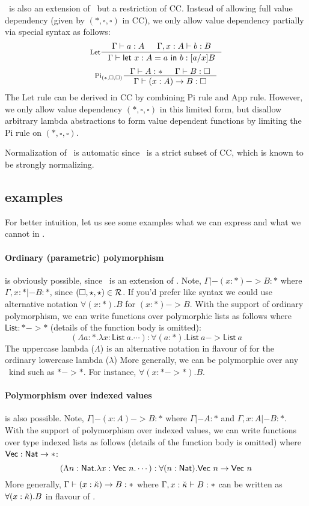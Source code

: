 \Fi\ is also an extension of \Fw\, but a restriction of CC.  Instead of
allowing full value dependency (given by $(*,\square,\square)$ in CC),
we only allow value dependency partially via special syntax as follows:
\[
 \inference[Let]{\Gamma |- a:A & \Gamma, x:A |- b:B}
                {\Gamma |- \mathsf{let}~x:A=a~\mathsf{in}~b : [a/x]B}
\]
\[
 \inference[Pi$_{(*,\square,\square)}$]
     {\Gamma |- A:* & \Gamma |- B:\square}
     {\Gamma |- (x:A)-> B : \square}
\]
The Let rule can be derived in CC by combining Pi rule and App rule.  However,
we only allow value dependency $(*,\square,\square)$ in this limited form,
but disallow arbitrary lambda abstractions to form value dependent functions
by limiting the Pi rule on $(*,\square,\square)$.

Normalization of \Fi\ is automatic since \Fi\ is a strict subset of CC,
which is known to be strongly normalizing.

\subsection{examples}
For better intuition, let us see some examples what we can express and
what we cannot in \Fi.
\newcommand{\List}{\mathsf{List}}
\newcommand{\Vect}{\mathsf{Vec}}

\paragraph{Ordinary (parametric) polymorphism} is obviously possible,
since \Fi\ is an extension of \Fw. Note, $\Gamma |- (x:*) -> B : *$
where $\Gamma,x:* |- B:*$, since $(\square,\star,\star) \in\mathcal{R}$.
If you'd prefer \Fw\-like syntax we could use alternative notation
$\forall(x:*).B$ for $(x:*) -> B$. With the support of ordinary polymorphism,
we can write functions over polymorphic lists as follows
where $\List : * -> *$ (details of the function body is omitted):
\[ (\Lambda a:*.\lambda x:\List~a. \cdots) : \forall(a:*).\List~a -> \List~a \]
The uppercase lambda ($\Lambda$) is an alternative notation in flavour of \Fw
for the ordinary lowercase lambda ($\lambda$)
More generally, we can be polymorphic over any \Fw\ kind such as $* -> *$.
For instance, $\forall(x:* -> *).B$.

\paragraph{Polymorphism over indexed values} is also possible.
Note, $\Gamma |- (x:A) -> B : *$ where $\Gamma |- A:*$ and $\Gamma,x:A |- B:*$.
With the support of polymorphism over indexed values, we can write functions
over type indexed lists as follows (details of the function body is omitted)
where $\Vect : \Nat -> *$:
\[
(\Lambda n:\Nat.\lambda x:\Vect~n. \cdots) : \forall(n:\Nat).\Vect~n -> \Vect~n 
\]
More generally, $\Gamma |- (x:{\check\kappa}) -> B : *$ where $\Gamma, x:{\check\kappa} |- B:*$
can be written as $\forall(x:{\check\kappa}).B$ in flavour of \Fw.

